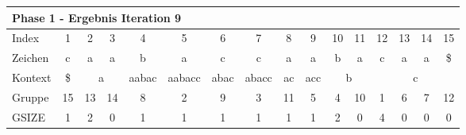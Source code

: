 \begin{table}[H]
\centering
\begin{adjustbox}{max width=\textwidth}
\begin{tabular}{lccccccccccccccc}
\multicolumn{16}{l}{Phase 1 - Ergebnis Iteration 9}                                                                                                                                                                                                                                                                                                                                                 \\ \hline
\multicolumn{1}{l|}{Index}   & 1                       & \cellcolor[HTML]{\green}2 & \cellcolor[HTML]{\green}3 & 4                          & 5                           & 6                         & 7                          & 8                       & 9                        & 10 & 11                      & 12 & 13                        & 14                        & 15  \\
\multicolumn{1}{l|}{Zeichen} & c                       & a                         & a                         & b                          & a                           & c                         & c                          & a                       & a                        & b  & a                       & c  & a                         & a                         & \$  \\ \cline{1-16}
\multicolumn{1}{l|}{Kontext} & \multicolumn{1}{c|}{\$} & \multicolumn{2}{c|}{a}                                & \multicolumn{1}{c|}{aabac} & \multicolumn{1}{c|}{aabacc} & \multicolumn{1}{c|}{abac} & \multicolumn{1}{c|}{abacc} & \multicolumn{1}{c|}{ac} & \multicolumn{1}{c|}{acc} & \multicolumn{2}{c|}{b}       & \multicolumn{4}{c}{c}                                            \\
\multicolumn{1}{l|}{Gruppe}      & \multicolumn{1}{c|}{15} & 13                        & \multicolumn{1}{c|}{14}   & \multicolumn{1}{c|}{8}     & \multicolumn{1}{c|}{2}      & \multicolumn{1}{c|}{9}    & \multicolumn{1}{c|}{3}     & \multicolumn{1}{c|}{11} & \multicolumn{1}{c|}{5}   & 4  & \multicolumn{1}{c|}{10} & 1  & 6                         & 7                         & 12  \\
\multicolumn{1}{l|}{GSIZE}   & \multicolumn{1}{c|}{1}  & 2                         & \multicolumn{1}{c|}{0}    & \multicolumn{1}{c|}{1}     & \multicolumn{1}{c|}{1}      & \multicolumn{1}{c|}{1}    & \multicolumn{1}{c|}{1}     & \multicolumn{1}{c|}{1}  & \multicolumn{1}{c|}{1}   & 2  & \multicolumn{1}{c|}{0}  & 4  & 0                         & 0                         & 0   \\

\end{tabular}
\end{adjustbox}
\end{table}
